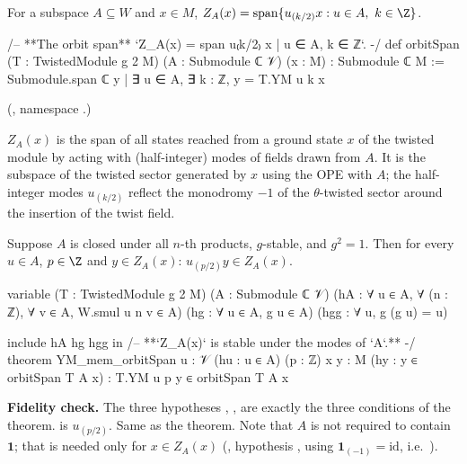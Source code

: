 \begin{definition}\label{ch11:def:orbitspan}
For a subspace $A\subseteq W$ and $x\in M$,
$Z_A(x)=\operatorname{span}\{u_{(k/2)}x : u\in A,\ k\in\Z\}$.
\end{definition}
\begin{leancode}
/-- **The orbit span** `Z_A(x) = span {u₍k/2₎ x | u ∈ A, k ∈ ℤ}`. -/
def orbitSpan (T : TwistedModule g 2 M) (A : Submodule ℂ 𝒱) (x : M) : Submodule ℂ M :=
  Submodule.span ℂ {y | ∃ u ∈ A, ∃ k : ℤ, y = T.YM u k x}
\end{leancode}
(, namespace .)

\begin{physics}
$Z_A(x)$ is the span of all states reached from a ground state $x$ of the twisted module by acting with (half-integer) modes of fields drawn from $A$. It is the subspace of the twisted sector generated by $x$ using the OPE with $A$; the half-integer modes $u_{(k/2)}$ reflect the monodromy $-1$ of the $\theta$-twisted sector around the insertion of the twist field.
\end{physics}

\begin{theorem}\label{ch11:thm:orbitspan}
Suppose $A$ is closed under all $n$-th products, $g$-stable, and $g^2=1$.  Then for every $u\in A$,
$p\in\Z$ and $y\in Z_A(x)$: $u_{(p/2)}y\in Z_A(x)$.
\end{theorem}
\begin{leancode}
variable (T : TwistedModule g 2 M) (A : Submodule ℂ 𝒱)
  (hA : ∀ u ∈ A, ∀ (n : ℤ), ∀ v ∈ A, W.smul u n v ∈ A) (hg : ∀ u ∈ A, g u ∈ A)
  (hgg : ∀ u, g (g u) = u)

include hA hg hgg in
/-- **`Z_A(x)` is stable under the modes of `A`.** -/
theorem YM_mem_orbitSpan {u : 𝒱} (hu : u ∈ A) (p : ℤ) {x y : M} (hy : y ∈ orbitSpan T A x) :
    T.YM u p y ∈ orbitSpan T A x
\end{leancode}
\begin{dictionary}
\textbf{Fidelity check.}  The three hypotheses , ,  are exactly the
three conditions of the theorem.   is $u_{(p/2)}$.  Same as the theorem.  Note that
$A$ is not required to contain $\mathbf 1$; that is needed only for $x\in Z_A(x)$
(, hypothesis , using $\mathbf 1_{(-1)}=\mathrm{id}$,
i.e.\ ).
\end{dictionary}


